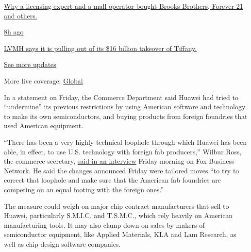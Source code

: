 \href{https://www.nytimes3xbfgragh.onion/live/2020/09/09/business/stock-market-today-coronavirus?action=click\&pgtype=Article\&state=default\&region=MAIN_CONTENT_1\&context=storylines_live_updates\#why-a-licensing-expert-and-a-mall-operator-bought-brooks-brothers-forever-21-and-others}{Why
a licensing expert and a mall operator bought Brooks Brothers, Forever
21 and others.}

\href{https://www.nytimes3xbfgragh.onion/live/2020/09/09/business/stock-market-today-coronavirus?action=click\&pgtype=Article\&state=default\&region=MAIN_CONTENT_1\&context=storylines_live_updates\#lvmh-says-it-is-pulling-out-of-its-16-billion-takeover-of-tiffany}{8h
ago}

\href{https://www.nytimes3xbfgragh.onion/live/2020/09/09/business/stock-market-today-coronavirus?action=click\&pgtype=Article\&state=default\&region=MAIN_CONTENT_1\&context=storylines_live_updates\#lvmh-says-it-is-pulling-out-of-its-16-billion-takeover-of-tiffany}{LVMH
says it is pulling out of its \$16 billion takeover of Tiffany.}

\href{https://www.nytimes3xbfgragh.onion/live/2020/09/09/business/stock-market-today-coronavirus?action=click\&pgtype=Article\&state=default\&region=MAIN_CONTENT_1\&context=storylines_live_updates}{See
more updates}

More live coverage:
\href{https://www.nytimes3xbfgragh.onion/2020/09/09/world/covid-19-coronavirus.html?action=click\&pgtype=Article\&state=default\&region=MAIN_CONTENT_1\&context=storylines_live_updates}{Global}

In a statement on Friday, the Commerce Department said Huawei had tried
to ``undermine'' its previous restrictions by using American software
and technology to make its own semiconductors, and buying products from
foreign foundries that used American equipment.

``There has been a very highly technical loophole through which Huawei
has been able, in effect, to use U.S. technology with foreign fab
producers,'' Wilbur Ross, the commerce secretary,
\href{https://video.foxbusiness.com/v/6156862016001/\#sp=show-clips}{said
in an interview} Friday morning on Fox Business Network. He said the
changes announced Friday were tailored moves ``to try to correct that
loophole and make sure that the American fab foundries are competing on
an equal footing with the foreign ones.''

The measure could weigh on major chip contract manufacturers that sell
to Huawei, particularly S.M.I.C. and T.S.M.C., which rely heavily on
American manufacturing tools. It may also clamp down on sales by makers
of semiconductor equipment, like Applied Materials, KLA and Lam
Research, as well as chip design software companies.

